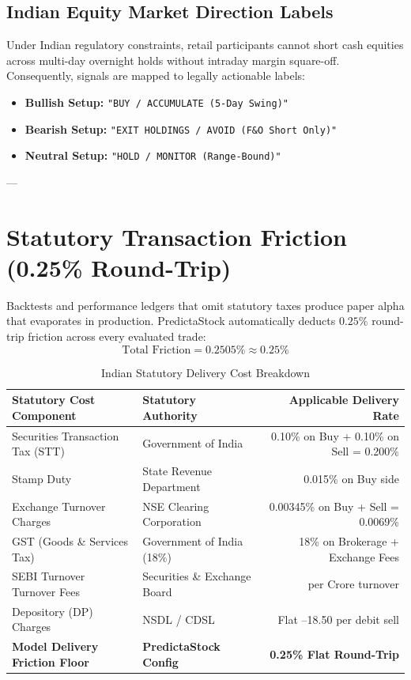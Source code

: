 \documentclass[11pt,a4paper]{article}
\begin{document}
\subsection{Indian Equity Market Direction Labels}
Under Indian regulatory constraints, retail participants cannot short cash equities across multi-day overnight holds without intraday margin square-off. Consequently, signals are mapped to legally actionable labels:
\begin{itemize}
    \item \textbf{Bullish Setup:} \texttt{"BUY / ACCUMULATE (5-Day Swing)"}
    \item \textbf{Bearish Setup:} \texttt{"EXIT HOLDINGS / AVOID (F\&O Short Only)"}
    \item \textbf{Neutral Setup:} \texttt{"HOLD / MONITOR (Range-Bound)"}
\end{itemize}

---

\section{Statutory Transaction Friction (0.25\% Round-Trip)}

Backtests and performance ledgers that omit statutory taxes produce paper alpha that evaporates in production. PredictaStock automatically deducts $0.25\%$ round-trip friction across every evaluated trade:
\begin{equation}
\text{Total Friction} = 0.2505\% \approx 0.25\%
\end{equation}

\begin{table}[h!]
\centering
\small
\begin{tabular}{llr}
\toprule
\textbf{Statutory Cost Component} & \textbf{Statutory Authority} & \textbf{Applicable Delivery Rate} \\
\midrule
Securities Transaction Tax (STT) & Government of India & 0.10\% on Buy + 0.10\% on Sell = 0.200\% \\
Stamp Duty & State Revenue Department & 0.015\% on Buy side \\
Exchange Turnover Charges & NSE Clearing Corporation & 0.00345\% on Buy + Sell = 0.0069\% \\
GST (Goods \& Services Tax) & Government of India (18\%) & 18\% on Brokerage + Exchange Fees \\
SEBI Turnover Turnover Fees & Securities \& Exchange Board & \rupee 10 per Crore turnover \\
Depository (DP) Charges & NSDL / CDSL & Flat \rupee 13.50--18.50 per debit sell \\
\midrule
\textbf{Model Delivery Friction Floor} & \textbf{PredictaStock Config} & \textbf{0.25\% Flat Round-Trip} \\
\bottomrule
\end{tabular}
\caption{Indian Statutory Delivery Cost Breakdown}
\end{table}
\end{document}
